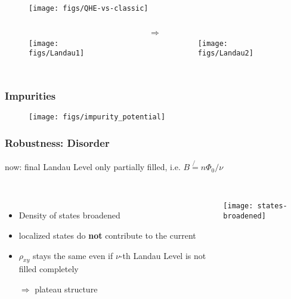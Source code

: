 \begin{frame}
	\begin{figure}
		\centering
		\texttt{[image: figs/QHE-vs-classic]}
		\label{fig:integer-qhe}
	\end{figure}
	\pause {}
\end{frame}

\begin{frame}
\begin{columns}
	\begin{figure}
		\centering
		\texttt{[image: figs/Landau1]}
		\label{fig:landau1}
	\end{figure}
	\centering{}
	\pause
	\centering
	$\Rightarrow$
	\begin{figure}
		\centering
		\texttt{[image: figs/Landau2]}
		\label{fig:landau2}
	\end{figure}
\end{columns}


\end{frame}

\begin{frame}
\frametitle{Impurities}
\begin{figure}
	\centering
	\texttt{[image: figs/impurity\_potential]}
	\label{fig:impuritypotential}
\end{figure}
\end{frame}

\begin{frame}
\frametitle{Robustness: Disorder}
now: final Landau Level only partially filled, i.e. $B \not{=} n\Phi_0/\nu$\\\ \\
\begin{columns}
	\column[]{7cm}
	\begin{itemize}
		\item Density of states broadened\\
		\item localized states do \textbf{not} contribute to the current\\
		\item $\rho_{xy}$ stays the same even if $\nu$-th Landau Level is not filled completely
		

		$\Rightarrow$ plateau structure
	\end{itemize}
	\column[]{5cm}
	\texttt{[image: states-broadened]}
\end{columns}



\end{frame}

